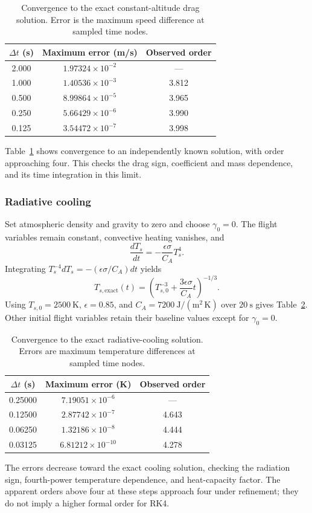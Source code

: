 \documentclass[conf]{new-aiaa}
\begin{document}
\begin{table}[htbp]
\caption{Convergence to the exact constant-altitude drag solution.
Error is the maximum speed difference at sampled time nodes.}
\label{tab:exact-drag}
\centering
\begin{tabular}{ccc}
\hline
$\Delta t$ (s) & Maximum error (m/s) & Observed order\\
\hline
2.000 & $1.97324\times10^{-2}$ & ---\\
1.000 & $1.40536\times10^{-3}$ & 3.812\\
0.500 & $8.99864\times10^{-5}$ & 3.965\\
0.250 & $5.66429\times10^{-6}$ & 3.990\\
0.125 & $3.54472\times10^{-7}$ & 3.998\\
\hline
\end{tabular}
\end{table}
Table~\ref{tab:exact-drag} shows convergence to an independently known
solution, with order approaching four. This checks the drag sign,
coefficient and mass dependence, and its time integration in this limit.

\subsubsection{Radiative cooling}

Set atmospheric density and gravity to zero and choose $\gamma_0=0$.
The flight variables remain constant, convective heating vanishes, and
\begin{equation}
\frac{dT_s}{dt}=-\frac{\epsilon\sigma}{C_A}T_s^4.
\end{equation}
Integrating $T_s^{-4}dT_s=-(\epsilon\sigma/C_A)dt$ yields
\begin{equation}
T_{s,\mathrm{exact}}(t)=
\left(T_{s,0}^{-3}+\frac{3\epsilon\sigma}{C_A}t\right)^{-1/3}.
\end{equation}
Using $T_{s,0}=2500~\mathrm{K}$, $\epsilon=0.85$, and
$C_A=7200~\mathrm{J/(m^2\,K)}$ over $20~\mathrm{s}$ gives
Table~\ref{tab:exact-cooling}. Other initial flight variables retain their
baseline values except for $\gamma_0=0$.

\begin{table}[htbp]
\caption{Convergence to the exact radiative-cooling solution.
Errors are maximum temperature differences at sampled time nodes.}
\label{tab:exact-cooling}
\centering
\begin{tabular}{ccc}
\hline
$\Delta t$ (s) & Maximum error (K) & Observed order\\
\hline
0.25000 & $7.19051\times10^{-6}$ & ---\\
0.12500 & $2.87742\times10^{-7}$ & 4.643\\
0.06250 & $1.32186\times10^{-8}$ & 4.444\\
0.03125 & $6.81212\times10^{-10}$ & 4.278\\
\hline
\end{tabular}
\end{table}
The errors decrease toward the exact cooling solution, checking the radiation
sign, fourth-power temperature dependence, and heat-capacity factor. The
apparent orders above four at these steps approach four under refinement;
they do not imply a higher formal order for RK4.
\end{document}
